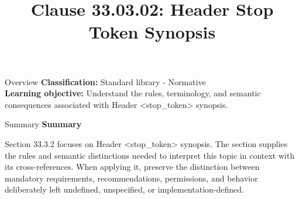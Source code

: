 \documentclass[10pt,letterpaper]{article}
\title{Clause 33.03.02: Header Stop Token Synopsis}
\author{}
\date{}
\begin{document}
\maketitle
\begin{CornellOverviewBox}{Overview}
\textbf{Classification:} Standard library - Normative\\[2pt]
\textbf{Learning objective:} Understand the rules, terminology, and semantic consequences associated with Header <stop\_token> synopsis.
\end{CornellOverviewBox}\begin{CornellSummaryBox}{Summary}
{\sffamily\bfseries\color{Accent} Summary}\par\vspace{3pt}Section 33.3.2 focuses on Header <stop\_token> synopsis. The section supplies the rules and semantic distinctions needed to interpret this topic in context with its cross-references. When applying it, preserve the distinction between mandatory requirements, recommendations, permissions, and behavior deliberately left undefined, unspecified, or implementation-defined.
\end{CornellSummaryBox}
\end{document}
